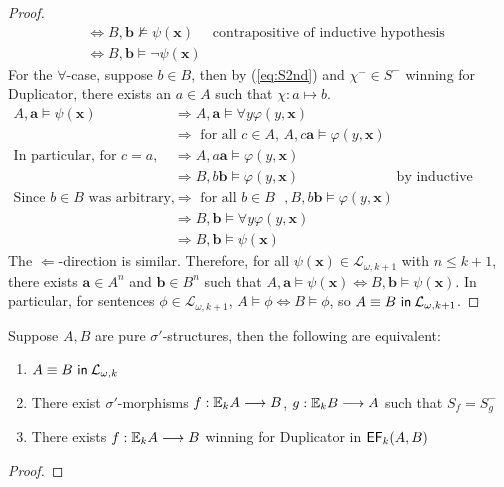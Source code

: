 \begin{prop}
\begin{proof}
\begin{align*}
&\Leftrightarrow B,\mathbf{b} \not\vDash \psi(\mathbf{x})  & \text{contrapositive of inductive hypothesis}\\
&\Leftrightarrow B,\mathbf{b} \vDash \neg\psi(\mathbf{x}) 
\end{align*}
For the $\forall$-case, suppose $b \in B$, then by (\ref{eq:S2nd}) and $\chi^{-} \in S^{-}$ winning for Duplicator, there exists an $a \in A$ such that $\chi:a \mapsto b$. 
\begin{align*}
A,\mathbf{a} \vDash \psi(\mathbf{x})  &\Rightarrow A,\mathbf{a} \vDash \forall y \varphi(y,\mathbf{x}) \\
&\Rightarrow \text{ for all $c \in A$, } A,c\mathbf{a} \vDash \varphi(y,\mathbf{x}) \\
\text{In particular, for $c = a$,} &\Rightarrow A,a\mathbf{a} \vDash \varphi(y,\mathbf{x})\\
&\Rightarrow B,b\mathbf{b} \vDash \varphi(y,\mathbf{x}) & \text{by inductive hypothesis}\\
\text{Since $b \in B$ was arbitrary,} &\Rightarrow \text{ for all $b \in B$ }, B,b\mathbf{b} \vDash \varphi(y,\mathbf{x}) \\
&\Rightarrow B,\mathbf{b} \vDash \forall y \varphi(y,\mathbf{x}) \\ 
&\Rightarrow B,\mathbf{b} \vDash \psi(\mathbf{x}) 
\end{align*}
The $\Leftarrow$-direction is similar. Therefore, for all $\psi(\mathbf{x}) \in \mathcal{L}_{\omega,k+1}$ with $n \leq k+1$, there exists $\mathbf{a} \in A^{n}$ and $\mathbf{b} \in B^{n}$ such that $A,\mathbf{a} \vDash \psi(\mathbf{x}) \Leftrightarrow B,\mathbf{b} \vDash \psi(\mathbf{x})$. In particular, for sentences $\phi \in \mathcal{L}_{\omega,k+1}$, $A \vDash \phi \Leftrightarrow B \vDash \phi$, so ${A \equiv B \ \mathsf{in}\: \mathcal{L}_{\omega,k+1}}$. 
\end{proof}
\begin{cor}
Suppose $A,B$ are pure $\sigma'$-structures, then the following are equivalent:
\begin{enumerate}[label=(\arabic*)]
\item ${A \equiv B \ \mathsf{in}\: \mathcal{L}_{\omega,k}}$ 
\item There exist $\sigma'$-morphisms $f:{\mathbb{E}_{k}A} \longrightarrow B$, $g:{\mathbb{E}_{k}B} \longrightarrow A$ such that $S_{f} = S_{g}^{-}$ 
\item There exists $f:{\mathbb{E}_{k}A} \longrightarrow B$ winning for Duplicator in ${\mathsf{EF}_{k}(A,B)}$ 
\end{enumerate}
\begin{proof}

\end{proof}
\end{cor}
\end{prop}
